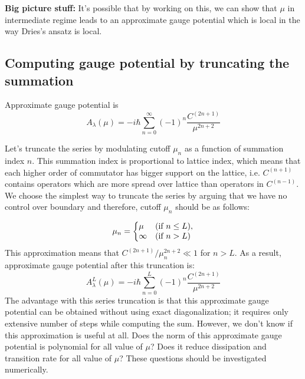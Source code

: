 \documentclass[11pt,a4paper]{article}
\begin{document}
\textbf{Big picture stuff:} It's possible that by working on this, we can show that $\mu$ in intermediate regime leads to an approximate gauge potential which is local in the way Dries's ansatz is local.

\subsection{Computing gauge potential by truncating the summation}

Approximate gauge potential is 
\begin{equation}
 A_{\lambda}(\mu) =  -i\hbar \sum_{n=0}^{\infty}   (-1)^{n} \dfrac{ C^{(2n+1)}}{\mu^{2n+2}}
\end{equation}

Let's truncate the series by modulating cutoff $\mu_n$ as a function of summation index $n$. This summation index is proportional to lattice index, which means that each higher order of commutator  has bigger support on the lattice, i.e. $C^{(n+1)}$ contains operators which are more spread over lattice than operators in $C^{(n-1)}$. We choose the simplest way to truncate the series by arguing that we have no control over boundary and therefore, cutoff $\mu_n$ should be as follows:

\begin{equation}
  \mu_n=\left\{
  \begin{array}{@{}ll@{}}
   \mu & (\mbox{if } n \leq L), \\
   \infty & (\mbox{if } n > L)
  \end{array}\right.
\end{equation}
This approximation means that $C^{(2n+1)}/\mu^{2n+2}_n \ll 1 $ for $n> L$. As a result, approximate gauge potential after this truncation is: 
\begin{equation}
 A_{\lambda}^{L}(\mu) =  -i\hbar \sum_{n=0}^{L}   (-1)^{n} \dfrac{ C^{(2n+1)}}{\mu^{2n+2}}
\end{equation}
The advantage with this series truncation is that this approximate gauge potential can be obtained without using exact diagonalization; it requires only extensive number of steps while computing the sum. However, we don't know if this approximation is useful at all. Does the norm of this approximate gauge potential is polynomial for all value of $\mu$? Does it reduce dissipation and transition rate for all value of $\mu$? These questions should be investigated numerically.
\end{document}
